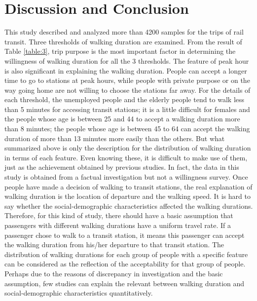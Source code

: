 \documentclass[Journal,letterpaper]{ascelike-new}
\begin{document}
\section{Discussion and Conclusion}
This study described and analyzed more than 4200 samples for the trips of rail transit. Three thresholds of walking duration are examined. From the result of Table \ref{table:3}, trip purpose is the most important factor in determining the willingness of walking duration for all the 3 thresholds. The feature of peak hour is also significant in explaining the walking duration. People can accept a longer time to go to stations at peak hours, while people with private purpose or on the way going home are not willing to choose the stations far away. For the details of each threshold, the unemployed people and the elderly people tend to walk less than 5 minutes for accessing transit stations; it is a little difficult for females and the people whose age is between 25 and 44 to accept a walking duration more than 8 minutes; the people whose age is between 45 to 64 can accept the walking duration of more than 13 minutes more easily than the others.
%
But what summarized above is only the description for the distribution of walking duration in terms of each feature. Even knowing these, it is difficult to make use of them, just as the achievement obtained by previous studies. In fact, the data in this study is obtained from a factual investigation but not a willingness survey. Once people have made a decision of walking to transit stations, the real explanation of walking duration is the location of departure and the walking speed. It is hard to say whether the social-demographic characteristics affected the walking durations. Therefore, for this kind of study, there should have a basic assumption that passengers with different walking durations have a uniform travel rate. If a passenger chose to walk to a transit station, it means this passenger can accept the walking duration from his/her departure to that transit station. The distribution of walking durations for each group of people with a specific feature can be considered as the reflection of the acceptability for that group of people. Perhaps due to the reasons of discrepancy in investigation and the basic assumption, few studies can explain the relevant between walking duration and social-demographic characteristics quantitatively.
%
\end{document}
